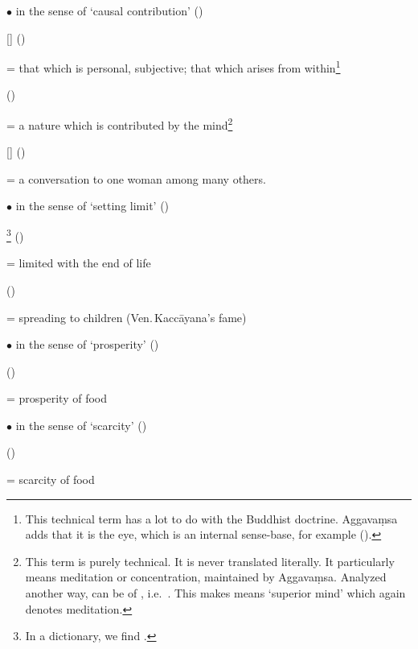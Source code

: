 $\bullet$  in the sense of `causal contribution' ()\par
{} [] ()\par \hspace{3mm} = that which is personal, subjective; that which arises from within\footnote{This technical term has a lot to do with the Buddhist doctrine. Aggava\d msa adds that it is the eye, which is an internal sense-base, for example ().}\par
{} ()\par \hspace{3mm} = a nature which is contributed by the mind\footnote{This term is purely technical. It is never translated literally. It particularly means meditation or concentration, maintained by Aggava\d msa. Analyzed another way,  can be of , i.e.\ . This makes  means `superior mind' which again denotes meditation.}\par
{} [] ()\par \hspace{3mm} = a conversation to one woman among many others.

$\bullet$  in the sense of `setting limit' ()\par
{}\footnote{In a dictionary, we find .} ()\par \hspace{3mm} = limited with the end of life\par
{} ()\par \hspace{3mm} = spreading to children (Ven.\,Kacc\=ayana's fame)

$\bullet$  in the sense of `prosperity' ()\par
{} ()\par \hspace{3mm} = prosperity of food

$\bullet$  in the sense of `scarcity' ()\par
{} ()\par \hspace{3mm} = scarcity of food

